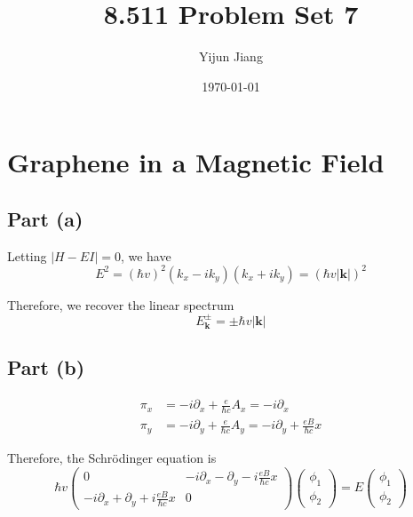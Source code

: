 \documentclass{article}
\title{8.511 Problem Set 7}
\author{Yijun Jiang}
\date{\today}
\begin{document}
\maketitle

\section{Graphene in a Magnetic Field}
\subsection{Part (a)}
Letting $|H-EI|=0$, we have
\begin{equation*}
E^2=(\hbar v)^2(k_x-ik_y)(k_x+ik_y)=(\hbar v|\mathbf{k}|)^2
\end{equation*}

Therefore, we recover the linear spectrum
\begin{equation*}
E_{\mathbf{k}}^{\pm}=\pm\hbar v|\mathbf{k}|
\end{equation*}

\subsection{Part (b)}
\begin{align*}
\pi_x&=-i\partial_x+\frac{e}{\hbar c}A_x=-i\partial_x\\
\pi_y&=-i\partial_y+\frac{e}{\hbar c}A_y=-i\partial_y+\frac{eB}{\hbar c}x
\end{align*}

Therefore, the Schr\"{o}dinger equation is
\begin{equation*}
\hbar v\left(\begin{array}{cc}0&-i\partial_x-\partial_y-i\frac{eB}{\hbar c}x\\-i\partial_x+\partial_y+i\frac{eB}{\hbar c}x&0\end{array}\right)\left(\begin{array}{c}\phi_1\\ \phi_2\end{array}\right)=E\left(\begin{array}{c}\phi_1\\ \phi_2\end{array}\right)
\end{equation*}
\end{document}
